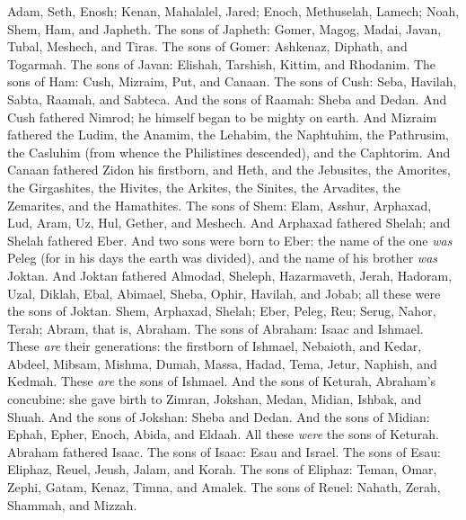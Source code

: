 
\begin{biblechapter} %
 Adam, Seth, Enosh;
\verse Kenan, Mahalalel, Jared;
\verse Enoch, Methuselah, Lamech;
\verse Noah, Shem, Ham, and Japheth.
\verse The sons of Japheth: Gomer, Magog, Madai, Javan, Tubal, Meshech, and Tiras.
\verse The sons of Gomer: Ashkenaz, Diphath, and Togarmah.
\verse The sons of Javan: Elishah, Tarshish, Kittim, and Rhodanim.
\verse The sons of Ham: Cush, Mizraim, Put, and Canaan.
\verse The sons of Cush: Seba, Havilah, Sabta, Raamah, and Sabteca. And the sons of Raamah: Sheba and Dedan.
\verse And Cush fathered Nimrod; he himself began to be mighty on earth.
\verse And Mizraim fathered the Ludim, the Anamim, the Lehabim, the Naphtuhim,
\verse the Pathrusim, the Casluhim (from whence the Philistines descended), and the Caphtorim.
\verse And Canaan fathered Zidon his firstborn, and Heth,
\verse and the Jebusites, the Amorites, the Girgashites,
\verse the Hivites, the Arkites, the Sinites,
\verse the Arvadites, the Zemarites, and the Hamathites.
\verse The sons of Shem: Elam, Asshur, Arphaxad, Lud, Aram, Uz, Hul, Gether, and Meshech.
\verse And Arphaxad fathered Shelah; and Shelah fathered Eber.
\verse And two sons were born to Eber: the name of the one \textit{was} Peleg (for in his days the earth was divided), and the name of his brother \textit{was} Joktan.
\verse And Joktan fathered Almodad, Sheleph, Hazarmaveth, Jerah,
\verse Hadoram, Uzal, Diklah,
\verse Ebal, Abimael, Sheba,
\verse Ophir, Havilah, and Jobab; all these were the sons of Joktan.
\verse Shem, Arphaxad, Shelah;
\verse Eber, Peleg, Reu;
\verse Serug, Nahor, Terah;
\verse Abram, that is, Abraham.
\verse The sons of Abraham: Isaac and Ishmael.
\verse These \textit{are} their generations: the firstborn of Ishmael, Nebaioth, and Kedar, Abdeel, Mibsam,
\verse Mishma, Dumah, Massa, Hadad, Tema,
\verse Jetur, Naphish, and Kedmah. These \textit{are} the sons of Ishmael.
\verse And the sons of Keturah, Abraham’s concubine: she gave birth to Zimran, Jokshan, Medan, Midian, Ishbak, and Shuah. And the sons of Jokshan: Sheba and Dedan.
\verse And the sons of Midian: Ephah, Epher, Enoch, Abida, and Eldaah. All these \textit{were} the sons of Keturah.
\verse Abraham fathered Isaac. The sons of Isaac: Esau and Israel.
\verse The sons of Esau: Eliphaz, Reuel, Jeush, Jalam, and Korah.
\verse The sons of Eliphaz: Teman, Omar, Zephi, Gatam, Kenaz, Timna, and Amalek.
\verse The sons of Reuel: Nahath, Zerah, Shammah, and Mizzah.

\end{biblechapter}
